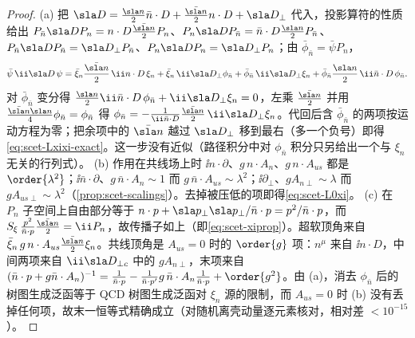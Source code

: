 \begin{proof}
(a) 把 $\sla D=\frac{\sla n}{2}\bar n\cdot D+\frac{\bar{\sla n}}{2}n\cdot D+\sla D_\perp$ 代入，投影算符的性质给出 $P_{\bar n}\sla DP_n=n\cdot D\frac{\bar{\sla n}}{2}P_n$、$P_n\sla DP_{\bar n}=\bar n\cdot D\frac{\sla n}{2}P_{\bar n}$、$P_{\bar n}\sla DP_{\bar n}=\sla D_\perp P_{\bar n}$、$P_n\sla DP_n=\sla D_\perp P_n$；由 $\bar\phi_{\bar n}=\bar\psi P_n$，
\begin{equation}\label{eq:scet-psiDpsi}
\bar\psi\,\ii\sla D\,\psi=\bar\xi_n\frac{\bar{\sla n}}{2}\,\ii n\cdot D\,\xi_n+\bar\xi_n\,\ii\sla D_\perp\phi_{\bar n}
+\bar\phi_{\bar n}\,\ii\sla D_\perp\xi_n+\bar\phi_{\bar n}\frac{\sla n}{2}\,\ii\bar n\cdot D\,\phi_{\bar n}.
\end{equation}
对 $\bar\phi_{\bar n}$ 变分得 $\frac{\sla n}{2}\ii\bar n\cdot D\,\phi_{\bar n}+\ii\sla D_\perp\xi_n=0$，左乘 $\frac{\bar{\sla n}}{2}$ 并用 $\frac{\bar{\sla n}\sla n}{4}\phi_{\bar n}=\phi_{\bar n}$ 得 $\phi_{\bar n}=-\frac{1}{\ii\bar n\cdot D}\frac{\bar{\sla n}}{2}\,\ii\sla D_\perp\xi_n$。代回后含 $\bar\phi_{\bar n}$ 的两项按运动方程为零；把余项中的 $\bar{\sla n}$ 越过 $\sla D_\perp$ 移到最右（多一个负号）即得\cref{eq:scet-Lxixi-exact}。这一步没有近似（路径积分中对 $\phi_{\bar n}$ 积分只另给出一个与 $\xi_n$ 无关的行列式）。
(b) 作用在共线场上时 $\ii n\cdot\partial$、$g\,n\cdot A_n$、$g\,n\cdot A_{us}$ 都是 $\order{\lambda^2}$；$\ii\bar n\cdot\partial$、$g\,\bar n\cdot A_n\sim1$ 而 $g\,\bar n\cdot A_{us}\sim\lambda^2$；$\ii\partial_\perp$、$gA_{n\perp}\sim\lambda$ 而 $gA_{us\perp}\sim\lambda^2$（\cref{prop:scet-scalings}）。去掉被压低的项即得\cref{eq:scet-L0xi}。
(c) 在 $P_n$ 子空间上自由部分等于 $n\cdot p+\sla p_\perp\sla p_\perp/\bar n\cdot p=p^2/\bar n\cdot p$，而 $S_\xi\,\frac{p^2}{\bar n\cdot p}\frac{\bar{\sla n}}{2}=\ii P_n$，故传播子如上（即\cref{eq:scet-xiprop}）。超软顶角来自 $\bar\xi_n\,g\,n\cdot A_{us}\frac{\bar{\sla n}}2\xi_n$。共线顶角是 $A_{us}=0$ 时的 $\order{g}$ 项：$n^\mu$ 来自 $\ii n\cdot D$，中间两项来自 $\ii\sla D_{\perp c}$ 中的 $gA_{n\perp}$，末项来自 $(\bar n\cdot p+g\bar n\cdot A_n)^{-1}=\frac{1}{\bar n\cdot p}-\frac{1}{\bar n\cdot p'}g\,\bar n\cdot A_n\frac{1}{\bar n\cdot p}+\order{g^2}$。由 (a)，消去 $\phi_{\bar n}$ 后的树图生成泛函等于 QCD 树图生成泛函对 $\xi_n$ 源的限制，而 $A_{us}=0$ 时 (b) 没有丢掉任何项，故末一恒等式精确成立（对随机离壳动量逐元素核对，相对差 $<10^{-15}$）。%
\end{proof}

